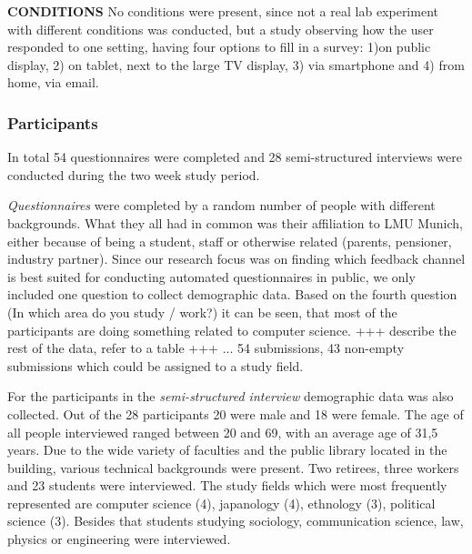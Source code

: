 	\textbf{CONDITIONS}
		No conditions were present, since not a real lab experiment with different conditions was conducted, but a study observing how the user responded to one setting, having four options to fill in a survey: 1)on public display, 2) on tablet, next to the large TV display, 3) via smartphone and 4) from home, via email.





	\subsubsection{Participants}

		In total 54 questionnaires were completed and 28 semi-structured interviews were conducted during the two week study period.

		\textit{Questionnaires} were completed by a random number of people with different backgrounds. What they all had in common was their affiliation to LMU Munich, either because of being a student, staff or otherwise related (parents, pensioner, industry partner). Since our research focus was on finding which feedback channel is best suited for conducting automated questionnaires in public, we only included one question to collect demographic data. Based on the fourth question (In which area do you study / work?) it can be seen, that most of the participants are doing something related to computer science.
			+++ describe the rest of the data, refer to a table +++
		 ... 
			54 submissions, 43 non-empty submissions which could be assigned to a study field.

		For the participants in the \textit{semi-structured interview} demographic data was also collected. Out of the 28 participants
		20 were male and 18 were female. The age of all people interviewed ranged between 20 and 69, with an average age of 31,5 years.
		Due to the wide variety of faculties and the public library located in the building, various technical backgrounds were present. Two retirees, three workers and 23 students were interviewed. The study fields which were most frequently represented are computer science (4), japanology (4), ethnology (3), political science (3). Besides that students studying sociology, communication science, law, physics or engineering were interviewed.


